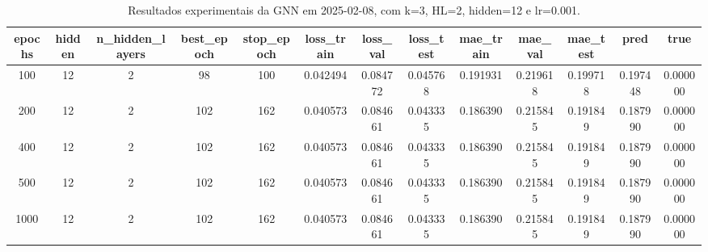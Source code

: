 \begin{table}[h]
\centering
\caption{Resultados experimentais da GNN em 2025-02-08, com k=3, HL=2, hidden=12 e lr=0.001.}
\label{tab:gnn_results_k3_hl2_h12_d20250208}
\begin{tabular}{ccccccccccccc}
\toprule
epochs & hidden & n\_hidden\_layers & best\_epoch & stop\_epoch & loss\_train & loss\_val & loss\_test & mae\_train & mae\_val & mae\_test & pred & true \\
\midrule
100 & 12 & 2 & 98 & 100 & 0.042494 & 0.084772 & 0.045768 & 0.191931 & 0.219618 & 0.199718 & 0.197448 & 0.000000 \\
200 & 12 & 2 & 102 & 162 & 0.040573 & 0.084661 & 0.043335 & 0.186390 & 0.215845 & 0.191849 & 0.187990 & 0.000000 \\
400 & 12 & 2 & 102 & 162 & 0.040573 & 0.084661 & 0.043335 & 0.186390 & 0.215845 & 0.191849 & 0.187990 & 0.000000 \\
500 & 12 & 2 & 102 & 162 & 0.040573 & 0.084661 & 0.043335 & 0.186390 & 0.215845 & 0.191849 & 0.187990 & 0.000000 \\
1000 & 12 & 2 & 102 & 162 & 0.040573 & 0.084661 & 0.043335 & 0.186390 & 0.215845 & 0.191849 & 0.187990 & 0.000000 \\
\bottomrule
\end{tabular}
\end{table}

